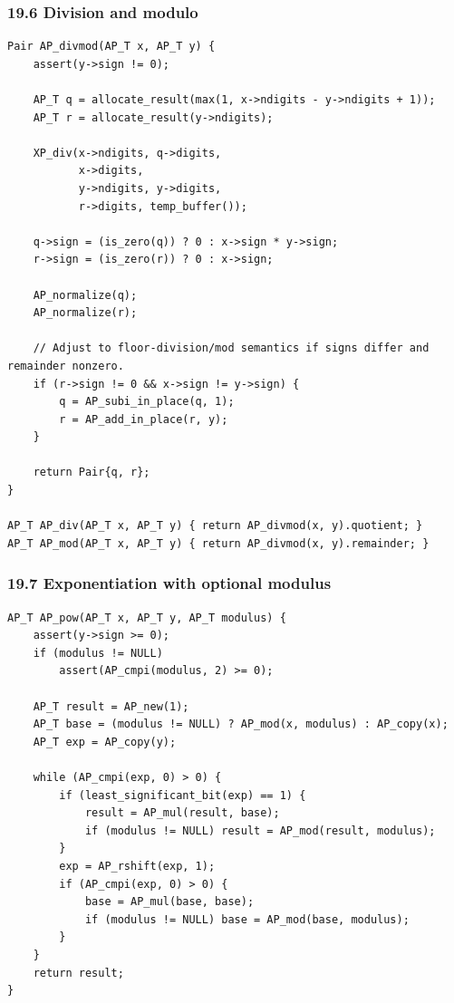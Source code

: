 \documentclass[11pt]{article}
\begin{document}
\subsubsection{19.6 Division and modulo}\label{division-and-modulo}

\begin{verbatim}
Pair AP_divmod(AP_T x, AP_T y) {
    assert(y->sign != 0);

    AP_T q = allocate_result(max(1, x->ndigits - y->ndigits + 1));
    AP_T r = allocate_result(y->ndigits);

    XP_div(x->ndigits, q->digits,
           x->digits,
           y->ndigits, y->digits,
           r->digits, temp_buffer());

    q->sign = (is_zero(q)) ? 0 : x->sign * y->sign;
    r->sign = (is_zero(r)) ? 0 : x->sign;

    AP_normalize(q);
    AP_normalize(r);

    // Adjust to floor-division/mod semantics if signs differ and remainder nonzero.
    if (r->sign != 0 && x->sign != y->sign) {
        q = AP_subi_in_place(q, 1);
        r = AP_add_in_place(r, y);
    }

    return Pair{q, r};
}

AP_T AP_div(AP_T x, AP_T y) { return AP_divmod(x, y).quotient; }
AP_T AP_mod(AP_T x, AP_T y) { return AP_divmod(x, y).remainder; }
\end{verbatim}

\subsubsection{19.7 Exponentiation with optional modulus}\label{exponentiation-with-optional-modulus}

\begin{verbatim}
AP_T AP_pow(AP_T x, AP_T y, AP_T modulus) {
    assert(y->sign >= 0);
    if (modulus != NULL)
        assert(AP_cmpi(modulus, 2) >= 0);

    AP_T result = AP_new(1);
    AP_T base = (modulus != NULL) ? AP_mod(x, modulus) : AP_copy(x);
    AP_T exp = AP_copy(y);

    while (AP_cmpi(exp, 0) > 0) {
        if (least_significant_bit(exp) == 1) {
            result = AP_mul(result, base);
            if (modulus != NULL) result = AP_mod(result, modulus);
        }
        exp = AP_rshift(exp, 1);
        if (AP_cmpi(exp, 0) > 0) {
            base = AP_mul(base, base);
            if (modulus != NULL) base = AP_mod(base, modulus);
        }
    }
    return result;
}
\end{verbatim}
\end{document}

